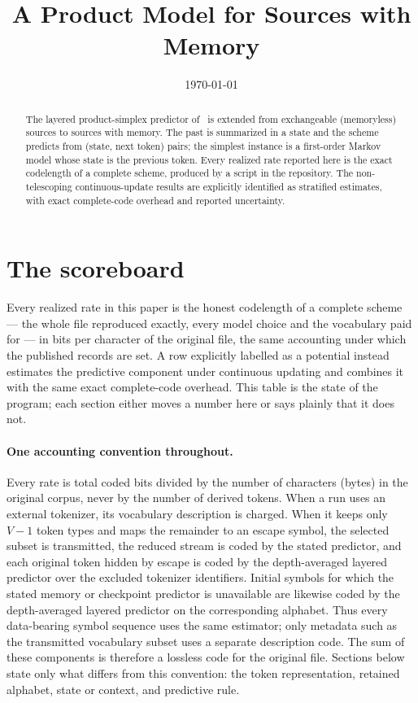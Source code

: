 \documentclass[11pt]{article}
\title{A Product Model for Sources with Memory}
\author{}
\date{\today}
\begin{document}
\maketitle

\begin{abstract}
The layered product-simplex predictor of~\cite{layered2026} is extended
from exchangeable (memoryless) sources to sources with memory.  The past
is summarized in a state and the scheme predicts from (state, next
token) pairs; the simplest instance is a first-order Markov model whose
state is the previous token.  Every realized rate reported here is the exact
codelength of a complete scheme, produced by a script in the repository.  The
non-telescoping continuous-update results are explicitly identified as
stratified estimates, with exact complete-code overhead and reported
uncertainty.
\end{abstract}

\section*{The scoreboard}
\label{sec:scoreboard}

Every realized rate in this paper is the honest codelength of a complete
scheme --- the whole file reproduced exactly, every model choice and the
vocabulary paid for --- in bits per character of the original file, the same
accounting under which the published records are set.  A row explicitly
labelled as a potential instead estimates the predictive component under
continuous updating and combines it with the same exact complete-code
overhead.  This table is the state of the program; each section either moves a
number here or says plainly that it does not.

\paragraph{One accounting convention throughout.}
Every rate is total coded bits divided by the number of characters (bytes) in
the original corpus, never by the number of derived tokens.  When a run uses
an external tokenizer, its vocabulary description is charged.  When it keeps
only $V-1$ token types and maps the remainder to an escape symbol, the selected
subset is transmitted, the reduced stream is coded by the stated predictor,
and each original token hidden by escape is coded by the depth-averaged layered
predictor over the excluded tokenizer identifiers.  Initial symbols for which
the stated memory or checkpoint predictor is unavailable are likewise coded
by the depth-averaged layered predictor on the corresponding alphabet.  Thus
every data-bearing symbol sequence uses the same estimator; only metadata such
as the transmitted vocabulary subset uses a separate description code.  The sum of these
components is therefore a lossless code for the original file.  Sections below
state only what differs from this convention: the token representation,
retained alphabet, state or context, and predictive rule.
\end{document}
